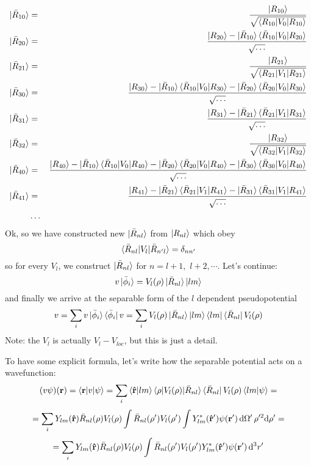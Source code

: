 \begin{eqnarray*}
\mathinner{|{\bar R_{10}}\rangle}&=&{\mathinner{|{R_{10}}\rangle}\over\sqrt{\mathinner{\langle{R_{10}|V_0|R_{10}}\rangle}}} \\
\mathinner{|{\bar R_{20}}\rangle}&=&{\mathinner{|{R_{20}}\rangle} -\mathinner{|{\bar R_{10}}\rangle}\mathinner{\langle{\bar R_{10}|V_0|R_{20}}\rangle}\over\sqrt{\dots}} \\
\mathinner{|{\bar R_{21}}\rangle}&=&{\mathinner{|{R_{21}}\rangle}\over\sqrt{\mathinner{\langle{R_{21}|V_1|R_{21}}\rangle}}} \\
\mathinner{|{\bar R_{30}}\rangle}&=&{\mathinner{|{R_{30}}\rangle} -\mathinner{|{\bar R_{10}}\rangle}\mathinner{\langle{\bar R_{10}|V_0|R_{30}}\rangle} -\mathinner{|{\bar R_{20}}\rangle}\mathinner{\langle{\bar R_{20}|V_0|R_{30}}\rangle} \over\sqrt{\dots}} \\
\mathinner{|{\bar R_{31}}\rangle}&=&{\mathinner{|{R_{31}}\rangle} -\mathinner{|{\bar R_{21}}\rangle}\mathinner{\langle{\bar R_{21}|V_1|R_{31}}\rangle} \over\sqrt{\dots}} \\
\mathinner{|{\bar R_{32}}\rangle}&=&{\mathinner{|{R_{32}}\rangle}\over\sqrt{\mathinner{\langle{R_{32}|V_1|R_{32}}\rangle}}} \\
\mathinner{|{\bar R_{40}}\rangle}&=&{\mathinner{|{R_{40}}\rangle} -\mathinner{|{\bar R_{10}}\rangle}\mathinner{\langle{\bar R_{10}|V_0|R_{40}}\rangle} -\mathinner{|{\bar R_{20}}\rangle}\mathinner{\langle{\bar R_{20}|V_0|R_{40}}\rangle} -\mathinner{|{\bar R_{30}}\rangle}\mathinner{\langle{\bar R_{30}|V_0|R_{40}}\rangle} \over\sqrt{\dots}} \\
\mathinner{|{\bar R_{41}}\rangle}&=&{\mathinner{|{R_{41}}\rangle} -\mathinner{|{\bar R_{21}}\rangle}\mathinner{\langle{\bar R_{21}|V_1|R_{41}}\rangle} -\mathinner{|{\bar R_{31}}\rangle}\mathinner{\langle{\bar R_{31}|V_1|R_{41}}\rangle} \over\sqrt{\dots}} \\
&\dots& \\
\end{eqnarray*}
 Ok, so we have constructed new $\mathinner{|{\bar R_{nl}}\rangle}$ from $\mathinner{|{R_{nl}}\rangle}$ which obey 
\begin{equation}
  \mathinner{\langle{\bar R_{nl}|V_l|\bar R_{n'l}}\rangle}=\delta_{nn'}  \label{orthog}
\end{equation}
so for every $V_l$, we construct $\mathinner{|{\bar R_{nl}}\rangle}$ for $n=l+1,\,\, l+2, \cdots$. Let's continue: 
\begin{equation*}
  v\mathinner{|{\bar\phi_i}\rangle}=V_l(\rho)\mathinner{|{\bar R_{nl}}\rangle}\mathinner{|{lm}\rangle}
\end{equation*}
and finally we arrive at the separable form of the $l$ dependent pseudopotential 
\begin{equation}
  v =\sum_{i}v\mathinner{|{\bar\phi_i}\rangle}\mathinner{\langle{\bar\phi_i}|}v =\sum_{i}V_l(\rho)\mathinner{|{\bar R_{nl}}\rangle}\mathinner{|{lm}\rangle} \mathinner{\langle{lm}|}\mathinner{\langle{\bar R_{nl}}|}V_l(\rho)  \label{Vsep}
\end{equation}
Note: the $V_l$ is actually $V_l-V_{loc}$, but this is just a detail.

To have some explicit formula, let's write how the separable potential acts on a wavefunction: 
\begin{equation*}
  (v\psi)({\bf r})=\mathinner{\langle{{\bf r}|v|\psi}\rangle}= \sum_i\mathinner{\langle{{\bf\hat r}|lm}\rangle}\mathinner{\langle{\rho|V_l(\rho)|\bar R_{nl}}\rangle} \mathinner{\langle{\bar R_{nl}}|}V_l(\rho)\mathinner{\langle{lm|\psi}\rangle}=
\end{equation*}
\begin{equation*}
  =\sum_iY_{lm}({\bf\hat r})\bar R_{nl}(\rho)V_l(\rho) \int \bar R_{nl}(\rho')V_l(\rho')\int Y_{lm}^*({\bf\hat r'})\psi({\bf r'})\,{\rm d} \Omega'\,\rho'^2 {\rm d}\rho'=
\end{equation*}
\begin{equation*}
  =\sum_iY_{lm}({\bf\hat r})\bar R_{nl}(\rho)V_l(\rho) \int \bar R_{nl}(\rho')V_l(\rho') Y_{lm}^*({\bf\hat r'})\psi({\bf r'})\,{\rm d}^3r'
\end{equation*}

